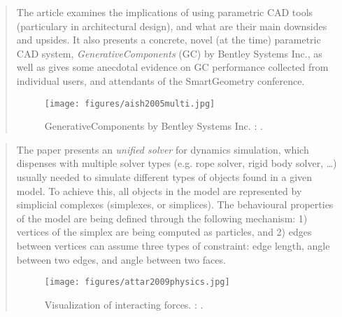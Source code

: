 \begin{quote}
		The article examines the implications of using parametric CAD tools (particulary
		in architectural design), and what are their main downsides and upsides.
		It also presents a concrete, novel (at the time) parametric CAD system, 
		{\em GenerativeComponents} (GC) by Bentley Systems Inc., as well as gives some
		anecdotal evidence on GC performance collected from individual users, and
		attendants of the SmartGeometry conference.
		\begin{figure}[htb]
		\begin{center}
		\texttt{[image: figures/aish2005multi.jpg]}
		\caption{
		GenerativeComponents by Bentley Systems Inc.  
		\citeauthor{aish2005multi}: 
		\cite{aish2005multi}.}
		\label{fig:aish2005multi}
		\end{center}
		\end{figure}				
		\end{quote}



		\begin{quote}
		The paper presents an {\em unified solver} for dynamics simulation,
		which dispenses with multiple solver types (e.g. rope solver, rigid body solver, \dots)
		usually needed to simulate
		different types of objects found in a given model.
		To achieve this, all objects in the model are represented by
		simplicial complexes (simplexes, or simplices). 
		The behavioural properties of the model are
		being defined through the following mechanism:
		1) vertices of the simplex are being computed as particles, and
		2) edges between vertices can assume three types of constraint:
		edge length, angle between two edges, and angle between two faces.
		
		\begin{figure}[htb]
		\begin{center}
		\texttt{[image: figures/attar2009physics.jpg]}
		\caption{
		Visualization of interacting forces.  
		\citeauthor{attar2009physics}: 
		\cite{attar2009physics}.}
		\label{fig:attar2009physics}
		\end{center}
		\end{figure}
		
		\end{quote}


